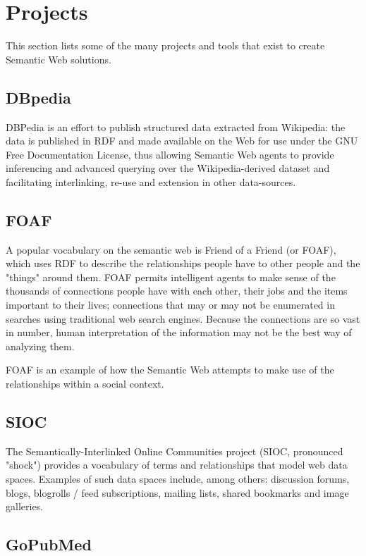 \section{Projects}

This section lists some of the many projects and tools that exist to create Semantic Web solutions.


\subsection{DBpedia}

DBPedia is an effort to publish structured data extracted from Wikipedia: the data is published in RDF and made available on the Web for use under the GNU Free Documentation License, thus allowing Semantic Web agents to provide inferencing and advanced querying over the Wikipedia-derived dataset and facilitating interlinking, re-use and extension in other data-sources.



\subsection{FOAF}

A popular vocabulary on the semantic web is Friend of a Friend (or FOAF), which uses RDF to describe the relationships people have to other people and the "things" around them. FOAF permits intelligent agents to make sense of the thousands of connections people have with each other, their jobs and the items important to their lives; connections that may or may not be enumerated in searches using traditional web search engines. Because the connections are so vast in number, human interpretation of the information may not be the best way of analyzing them.

FOAF is an example of how the Semantic Web attempts to make use of the relationships within a social context.

\subsection{SIOC}

The Semantically-Interlinked Online Communities project (SIOC, pronounced "shock") provides a vocabulary of terms and relationships that model web data spaces. Examples of such data spaces include, among others: discussion forums, blogs, blogrolls / feed subscriptions, mailing lists, shared bookmarks and image galleries.


\subsection{GoPubMed}

